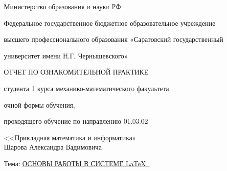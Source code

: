 
\begin{titlepage} 
\thispagestyle{empty} 
\centerline{Министерство образования и науки РФ} 
\centerline{Федеральное государственное бюджетное образовательное учреждение} 
\centerline{высшего профессионального образования «Саратовский государственный} 
\centerline{университет имени Н.Г. Чернышевского»}
\medskip%

\begin{center}%
\large ОТЧЕТ ПО ОЗНАКОМИТЕЛЬНОЙ ПРАКТИКЕ
\medskip

студента 1 курса механико-математического факультета

очной формы обучения,

проходящего обучение по направлению 01.03.02 

<<Прикладная математика и информатика» \\
Шарова Александра Вадимовича
\medskip
\end{center}
Тема: \underline{ОСНОВЫ РАБОТЫ В СИСТЕМЕ \LaTeX\ }
\medskip
{}

\vfill%
\vfill%
\end{titlepage} 
